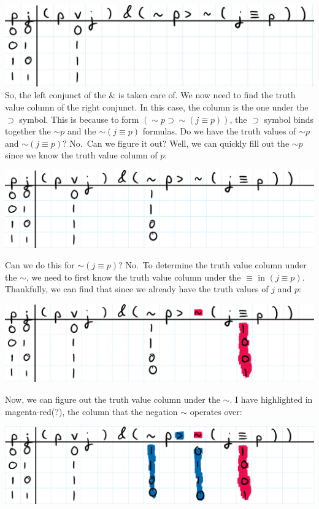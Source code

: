 \documentclass[
]{book}
\begin{document}
\includegraphics{Pictures/Week4Picture6.png}
So, the left conjunct of the \(\&\) is taken care of. We now need to find the truth value column of the right conjunct. In this case, the column is the one under the \(\supset\) symbol. This is because to form \((\sim p \supset \sim (j \equiv p))\), the \(\supset\) symbol binds together the \(\sim p\) and the \(\sim (j \equiv p)\) formulas. Do we have the truth values of \(\sim p\) and \(\sim (j \equiv p)\)? No.~Can we figure it out? Well, we can quickly fill out the \(\sim p\) since we know the truth value column of \(p\):

\includegraphics{Pictures/Week4Picture7.png}

Can we do this for \(\sim (j \equiv p)\)? No.~To determine the truth value column under the \(\sim\), we need to first know the truth value column under the \(\equiv\) in \((j \equiv p)\). Thankfully, we can find that since we already have the truth values of \(j\) and \(p\):

\includegraphics{Pictures/Week4Picture8.png}

Now, we can figure out the truth value column under the \(\sim\). I have highlighted in magenta-red(?), the column that the negation \(\sim\) operates over:

\includegraphics{Pictures/Week4Picture9.png}
\end{document}
